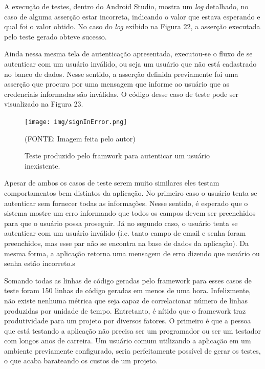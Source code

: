 \documentclass[
    12pt,       %
    openright,      %
    twoside,      %
    a4paper,      %
    english,      %
    french,       %
    spanish,      %
    brazil,       %
    ]{abntex2}
\begin{document}
      A execução de testes, dentro do Android Studio, mostra um \textit{log} detalhado, no caso de alguma
      asserção estar incorreta, indicando o valor que estava esperando e qual foi o valor obtido. No caso do
      \textit{log} exibido na Figura 22, a asserção executada pelo teste gerado obteve sucesso.

      Ainda nessa mesma tela de autenticação apresentada, executou-se o fluxo de se autenticar com
      um usuário inválido, ou seja um usuário que não está cadastrado no banco de dados. Nesse sentido,
      a asserção definida previamente foi uma asserção que procura por uma mensagem que informe ao
      usuário que as credenciais informadas são inválidas. O código desse caso de teste pode ser visualizado
      na Figura 23.

      \begin{figure}[htbp]
        \begin{center}
          \texttt{[image: img/signInError.png]}
            \end{center}
          \caption{\label{fig:passaro} Teste produzido pelo framwork para autenticar um usuário inexistente.}
        \begin{center}(FONTE: Imagem feita pelo autor)\end{center}
      \end{figure}

      Apesar de ambos os casos de teste serem muito similares eles testam comportamentos bem distintos da
      aplicação. No primeiro caso o usuário tenta se autenticar sem fornecer todas as informações. Nesse
      sentido, é esperado que o sistema mostre um erro informando que todos os campos devem ser preenchidos
      para que o usuário possa proseguir. Já no segundo caso, o usuário tenta se autenticar com um usuário
      inválido (i.e. tanto campo de email e senha foram preenchidos, mas esse par não se encontra na base
      de dados da aplicação). Da mesma forma, a aplicação retorna uma mensagem de erro dizendo que usuário
      ou senha estão incorreto.s

      Somando todas as linhas de código geradas pelo framework para esses casos de teste foram 150 linhas
      de código geradas em menos de uma hora. Infelizmente, não existe nenhuma métrica que seja capaz de
      correlacionar número de linhas produzidas por unidade de tempo. Entretanto, é nítido que o framework
      traz produtividade para um projeto por diversos fatores. O primeiro é que a pessoa que está testando
      a aplicação não precisa ser um programador ou ser um testador com longos anos de carreira. Um usuário
      comum utilizando a aplicação em um ambiente previamente configurado, seria perfeitamente possível
      de gerar os testes, o que acaba barateando os custos de um projeto.
\end{document}
